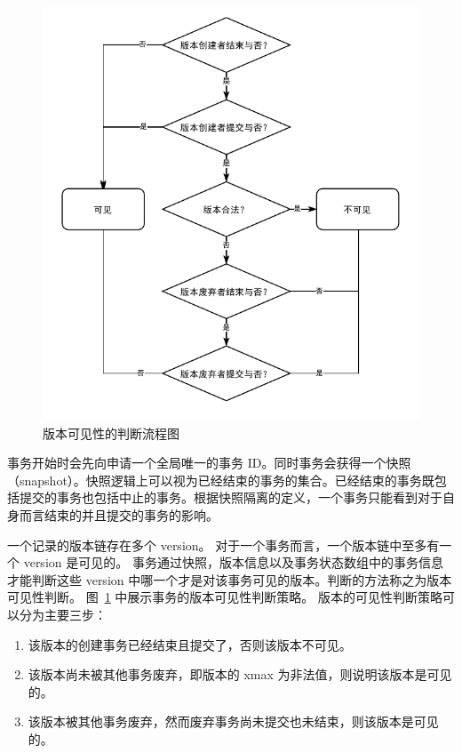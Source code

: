 \begin{figure}[ht]
    \centering
    \includegraphics[width=1\linewidth]{figures/version_visibility.pdf}
    \caption{版本可见性的判断流程图}
    \label{fig:version-visibility}
\end{figure}

事务开始时会先向申请一个全局唯一的事务 ID。同时事务会获得一个快照 （snapshot）。快照逻辑上可以视为已经结束的事务的集合。已经结束的事务既包括提交的事务也包括中止的事务。根据快照隔离的定义，一个事务只能看到对于自身而言结束的并且提交的事务的影响。

一个记录的版本链存在多个 version。
对于一个事务而言，一个版本链中至多有一个 version 是可见的。
事务通过快照，版本信息以及事务状态数组中的事务信息才能判断这些 version 中哪一个才是对该事务可见的版本。判断的方法称之为版本可见性判断。
图~\ref{fig:version-visibility} 中展示事务的版本可见性判断策略。
版本的可见性判断策略可以分为主要三步：
\begin{enumerate}
    \item 该版本的创建事务已经结束且提交了，否则该版本不可见。
    \item 该版本尚未被其他事务废弃，即版本的 xmax 为非法值，则说明该版本是可见的。
    \item 该版本被其他事务废弃，然而废弃事务尚未提交也未结束，则该版本是可见的。
\end{enumerate}



